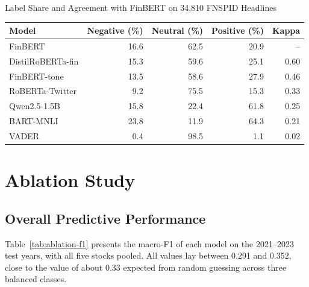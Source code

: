 \begin{utptable}{Label Share and Agreement with FinBERT on 34,810 FNSPID Headlines}
\label{tab:label-mix}
\begin{tabular}{@{}lrrrr@{}}
\toprule
\textbf{Model} & \textbf{Negative (\%)} & \textbf{Neutral (\%)} & \textbf{Positive (\%)} & \textbf{Kappa} \\
\midrule
FinBERT & 16.6 & 62.5 & 20.9 & -- \\
DistilRoBERTa-fin & 15.3 & 59.6 & 25.1 & 0.60 \\
FinBERT-tone & 13.5 & 58.6 & 27.9 & 0.46 \\
RoBERTa-Twitter & 9.2 & 75.5 & 15.3 & 0.33 \\
Qwen2.5-1.5B & 15.8 & 22.4 & 61.8 & 0.25 \\
BART-MNLI & 23.8 & 11.9 & 64.3 & 0.21 \\
VADER & 0.4 & 98.5 & 1.1 & 0.02 \\
\bottomrule
\end{tabular}
\end{utptable}

\section{Ablation Study}
\label{sec:ablation-results}

\subsection{Overall Predictive Performance}
Table~\ref{tab:ablation-f1} presents the macro-F1 of each model on the 2021--2023 test years, with all five stocks pooled. All values lay between 0.291 and 0.352, close to the value of about 0.33 expected from random guessing across three balanced classes.

